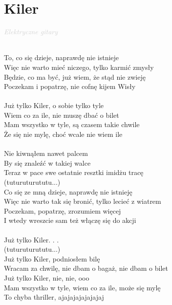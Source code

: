 \documentclass[a5paper, 10pt]{book}
\begin{document}
\section{Kiler}\textcolor{lightgray}{\textit{Elektryczne gitary}}\\~\\
\begin{minipage}[t]{0.7\textwidth}
To, co się dzieje, naprawdę nie istnieje\\
Więc nie warto mieć niczego, tylko karmić zmysły\\
Będzie, co ma być, już wiem, że stąd nie zwieję\\
Poczekam i popatrzę, nie cofnę kijem Wisły\\
\\
\hspace*{6mm}Już tylko Kiler, o sobie tylko tyle\\
\hspace*{6mm}Wiem co za ile, nie muszę dbać o bilet\\
\hspace*{6mm}Mam wszystko w tyle, są czasem takie chwile\\
\hspace*{6mm}Że się nie mylę, choć wcale nie wiem ile\\
\\
Nie kiwnąłem nawet palcem\\
By się znaleźć w takiej walce\\
Teraz w pace swe ostatnie resztki imidżu tracę\\
\hspace*{3mm}(tuturuturututu...)\\
Co się ze mną dzieje, naprawdę nie istnieję\\
Więc nie warto tak się bronić, tylko lecieć z wiatrem\\
Poczekam, popatrzę, zrozumiem więcej\\
I wtedy wreszcie sam też włączę się do akcji\\
\\
\hspace*{6mm}Już tylko Kiler. . .\\
\hspace*{3mm}(tuturuturututu...)\\
Już tylko Kiler, podniosłem bilę\\
Wracam za chwilę, nie dbam o bagaż, nie dbam o bilet\\
Już tylko Kiler, nie, nie, ooo\\
Mam wszystko w tyle, wiem co za ile, może się mylę\\
To chyba thriller, ajajajajajajajaj\\

\end{minipage}
\end{document}
